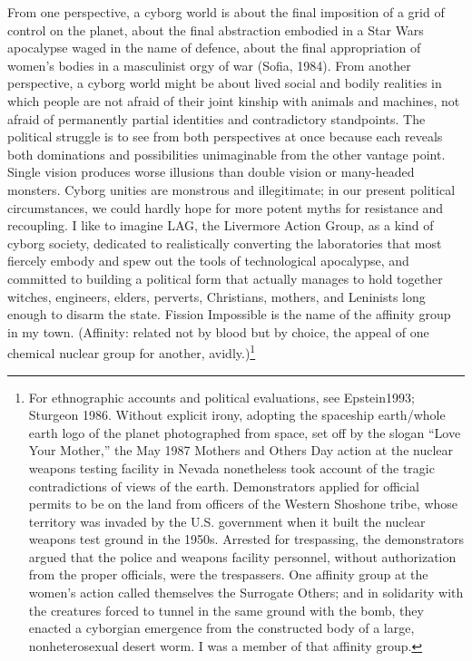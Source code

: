 \documentclass[DIV=12,%
               BCOR=10mm,%
               headinclude=false,%
               footinclude=false,open=any,%
               fontsize=11pt,%
               twoside,%
               paper=210mm:11in]%
               {scrbook}
\newcommand*{\Slash}{\slash\hspace{0pt}}
\begin{document}
From one perspective, a cyborg world is about the final imposition of a grid of control on the planet, about the final abstraction embodied in a Star Wars apocalypse waged in the name of defence, about the final appropriation of women’s bodies in a masculinist orgy of war (Sofia, 1984). From another perspective, a cyborg world might be about lived social and bodily realities in which people are not afraid of their joint kinship with animals and machines, not afraid of permanently partial identities and contradictory standpoints. The political struggle is to see from both perspectives at once because each reveals both dominations and possibilities unimaginable from the other vantage point. Single vision produces worse illusions than double vision or many-headed monsters. Cyborg unities are monstrous and illegitimate; in our present political circumstances, we could hardly hope for more potent myths for resistance and recoupling. I like to imagine LAG, the Livermore Action Group, as a kind of cyborg society, dedicated to realistically converting the laboratories that most fiercely embody and spew out the tools of technological apocalypse, and committed to building a political form that actually manages to hold together witches, engineers, elders, perverts, Christians, mothers, and Leninists long enough to disarm the state. Fission Impossible is the name of the affinity group in my town. (Affinity: related not by blood but by choice, the appeal of one chemical nuclear group for another, avidly.)\footnote{For ethnographic accounts and political evaluations, see Epstein1993; Sturgeon 1986. Without explicit irony, adopting the spaceship earth\Slash{}whole earth logo of the planet photographed from space, set off by the slogan “Love Your Mother,” the May 1987 Mothers and Others Day action at the nuclear weapons testing facility in Nevada nonetheless took account of the tragic contradictions of views of the earth. Demonstrators applied for official permits to be on the land from officers of the Western Shoshone tribe, whose territory was invaded by the U.S. government when it built the nuclear weapons test ground in the 1950s. Arrested for trespassing, the demonstrators argued that the police and weapons facility personnel, without authorization from the proper officials, were the trespassers. One affinity group at the women’s action called themselves the Surrogate Others; and in solidarity with the creatures forced to tunnel in the same ground with the bomb, they enacted a cyborgian emergence from the constructed body of a large, nonheterosexual desert worm. I was a member of that affinity group.}
\end{document}
